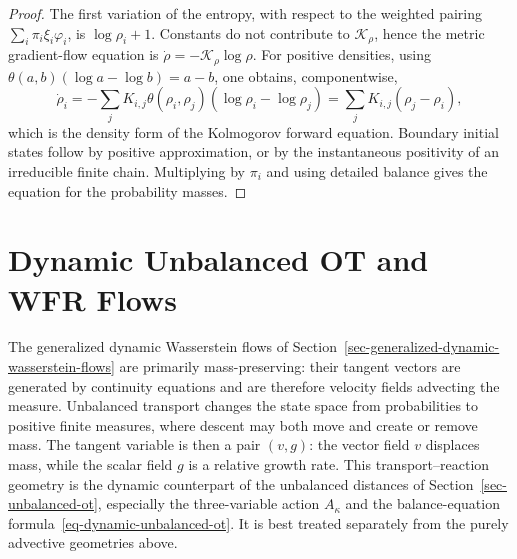 \begin{proof}
The first variation of the entropy, with respect to the weighted pairing \(\sum_i\pi_i\xi_i\varphi_i\), is \(\log\rho_i+1\). Constants do not contribute to \(\mathcal K_\rho\), hence the metric gradient-flow equation is
\(\dot\rho=-\mathcal K_\rho\log\rho\).
For positive densities, using
\(\theta(a,b)(\log a-\log b)=a-b\),
one obtains, componentwise,
\[
\dot\rho_i
=-\sum_jK_{i,j}\theta(\rho_i,\rho_j)(\log\rho_i-\log\rho_j)
=
\sum_jK_{i,j}(\rho_j-\rho_i),
\]
which is the density form of the Kolmogorov forward equation. Boundary initial states follow by positive approximation, or by the instantaneous positivity of an irreducible finite chain. Multiplying by \(\pi_i\) and using detailed balance gives the equation for the probability masses.
\end{proof}

\section{Dynamic Unbalanced OT and WFR Flows}
\label{sec-dynamic-unbalanced-wfr-flows}
\label{sec-wfr-gradient-flows}

The generalized dynamic Wasserstein flows of Section~\ref{sec-generalized-dynamic-wasserstein-flows} are primarily mass-preserving: their tangent vectors are generated by continuity equations and are therefore velocity fields advecting the measure. Unbalanced transport changes the state space from probabilities to positive finite measures, where descent may both move and create or remove mass. The tangent variable is then a pair \((v,g)\): the vector field \(v\) displaces mass, while the scalar field \(g\) is a relative growth rate. This transport--reaction geometry is the dynamic counterpart of the unbalanced distances of Section~\ref{sec-unbalanced-ot}, especially the three-variable action \(A_\kappa\) and the balance-equation formula~\eqref{eq-dynamic-unbalanced-ot}. It is best treated separately from the purely advective geometries above.

